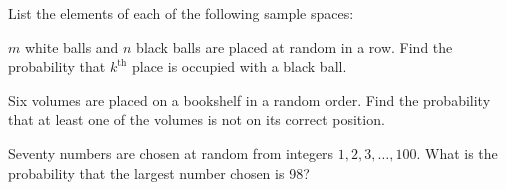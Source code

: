 \documentclass[14pt]{exam}
\begin{document}
\begin{questions}
		





		
		\question
		List the elements of each of the following sample spaces:
		
		





		
		\question
		$m$ white balls and $n$ black balls are placed at random in a row. Find the probability that $k^\text{th}$ place is occupied with a black ball.
		




		
		\question
		Six volumes are placed on a bookshelf in a random order. Find the probability that at least one of the volumes is not on its correct position.






		
		\question
		Seventy numbers are chosen at random from integers $1, 2, 3, \dots, 100$. What is the probability that the largest number chosen is 98?
		






\end{questions}
\end{document}
